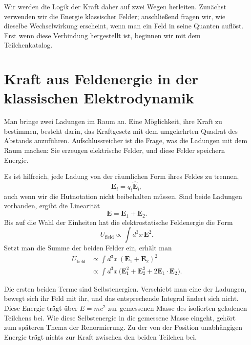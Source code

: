 Wir werden die Logik der Kraft daher auf zwei Wegen herleiten. Zunächst verwenden wir die Energie klassischer Felder; anschließend fragen wir, wie dieselbe Wechselwirkung erscheint, wenn man ein Feld in seine Quanten auflöst. Erst wenn diese Verbindung hergestellt ist, beginnen wir mit dem Teilchenkatalog.

\section{Kraft aus Feldenergie in der klassischen Elektrodynamik}

Man bringe zwei Ladungen im Raum an. Eine Möglichkeit, ihre Kraft zu bestimmen, besteht darin, das Kraftgesetz mit dem umgekehrten Quadrat des Abstands anzuführen. Aufschlussreicher ist die Frage, was die Ladungen mit dem Raum machen: Sie erzeugen elektrische Felder, und diese Felder speichern Energie.

Es ist hilfreich, jede Ladung von der räumlichen Form ihres Feldes zu trennen,
\begin{equation}
\mathbf E_i=q_i\widehat{\mathbf E}_i,
\end{equation}
auch wenn wir die Hutnotation nicht beibehalten müssen. Sind beide Ladungen vorhanden, ergibt die Linearität
\begin{equation}
\mathbf{E}=\mathbf{E}_1+\mathbf{E}_2.
\end{equation}
Bis auf die Wahl der Einheiten hat die elektrostatische Feldenergie die Form
\begin{equation}
U_{\text{field}}\propto\int d^3x\,\mathbf{E}^2.
\end{equation}
Setzt man die Summe der beiden Felder ein, erhält man
\begin{align}
U_{\text{field}}
&\propto\int d^3x\,(\mathbf{E}_1+\mathbf{E}_2)^2 \\
&\propto\int d^3x\,\bigl(\mathbf{E}_1^2+\mathbf{E}_2^2
  +2\mathbf{E}_1\!\cdot\!\mathbf{E}_2\bigr).
\end{align}

Die ersten beiden Terme sind Selbstenergien. Verschiebt man eine der Ladungen, bewegt sich ihr Feld mit ihr, und das entsprechende Integral ändert sich nicht. Diese Energie trägt über \(E=mc^2\) zur gemessenen Masse des isolierten geladenen Teilchens bei. Wie diese Selbstenergie in die gemessene Masse eingeht, gehört zum späteren Thema der Renormierung. Zu der von der Position unabhängigen Energie trägt nichts zur Kraft zwischen den beiden Teilchen bei.

